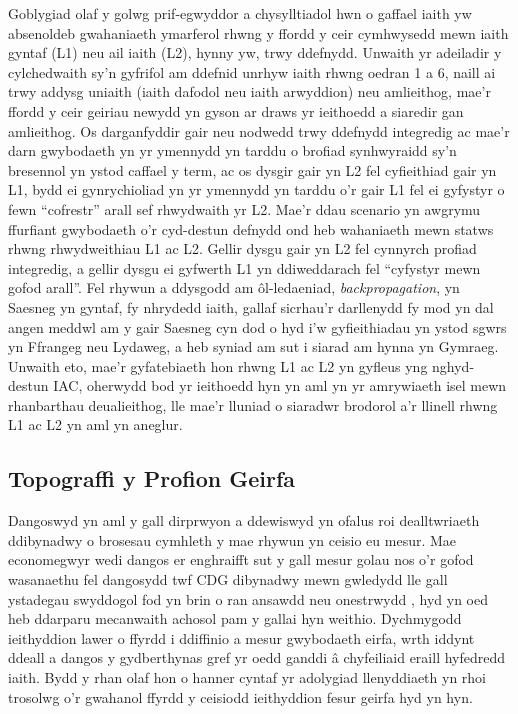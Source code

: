 Goblygiad olaf y golwg prif-egwyddor a chysylltiadol hwn o gaffael iaith yw absenoldeb gwahaniaeth ymarferol rhwng y ffordd y ceir cymhwysedd mewn iaith gyntaf (L1) neu ail iaith (L2), hynny yw, trwy ddefnydd. Unwaith yr adeiladir y cylchedwaith sy'n gyfrifol am ddefnid unrhyw iaith rhwng oedran 1 a 6, naill ai trwy addysg uniaith (iaith dafodol neu iaith arwyddion) neu amlieithog, mae'r ffordd y ceir geiriau newydd yn gyson ar draws yr ieithoedd a siaredir gan amlieithog. Os darganfyddir gair neu nodwedd trwy ddefnydd integredig ac mae'r darn gwybodaeth yn yr ymennydd yn tarddu o brofiad synhwyraidd sy'n bresennol yn ystod caffael y term, ac os dysgir gair yn L2 fel cyfieithiad gair yn L1, bydd ei gynrychioliad yn yr ymennydd yn tarddu o'r gair L1 fel ei gyfystyr o fewn ``cofrestr'' arall sef rhwydwaith yr L2. Mae'r ddau scenario yn awgrymu ffurfiant gwybodaeth o'r cyd-destun defnydd ond heb wahaniaeth mewn statws rhwng rhwydweithiau L1 ac L2. Gellir dysgu gair yn L2 fel cynnyrch profiad integredig, a gellir dysgu ei gyfwerth L1 yn ddiweddarach fel ``cyfystyr mewn gofod arall''. Fel rhywun a ddysgodd am ôl-ledaeniad, \textit{backpropagation}, yn Saesneg yn gyntaf, fy nhrydedd iaith, gallaf sicrhau'r darllenydd fy mod yn dal angen meddwl am y gair Saesneg cyn dod o hyd i'w gyfieithiadau yn ystod sgwrs yn Ffrangeg neu Lydaweg, a heb syniad am sut i siarad am hynna yn Gymraeg. Unwaith eto, mae'r gyfatebiaeth hon rhwng L1 ac L2 yn gyfleus yng nghyd-destun IAC, oherwydd bod yr ieithoedd hyn yn aml yn yr amrywiaeth isel mewn rhanbarthau deualieithog, lle mae'r lluniad o siaradwr brodorol a'r llinell rhwng L1 ac L2 yn aml yn aneglur.

\subsection{Topograffi y Profion Geirfa}
Dangoswyd yn aml y gall dirprwyon a ddewiswyd yn ofalus roi dealltwriaeth ddibynadwy o brosesau cymhleth y mae rhywun yn ceisio eu mesur. Mae economegwyr wedi dangos er enghraifft sut y gall mesur golau nos o'r gofod wasanaethu fel dangosydd twf CDG dibynadwy mewn gwledydd lle gall ystadegau swyddogol fod yn brin o ran ansawdd neu onestrwydd \parencite{henderson_measuring_2009}, hyd yn oed heb ddarparu mecanwaith achosol pam y gallai hyn weithio. Dychmygodd ieithyddion lawer o ffyrdd i ddiffinio a mesur gwybodaeth eirfa, wrth iddynt ddeall a dangos y gydberthynas gref yr oedd ganddi â chyfeiliaid eraill hyfedredd iaith. Bydd y rhan olaf hon o hanner cyntaf yr adolygiad llenyddiaeth yn rhoi trosolwg o'r gwahanol ffyrdd y ceisiodd ieithyddion fesur geirfa hyd yn hyn.

